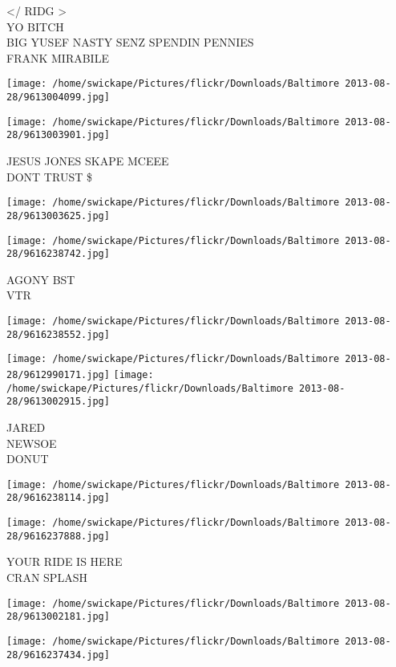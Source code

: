 \documentclass[10pt,letterpaper]{article}
\begin{document}
</  RIDG >\\
YO BITCH\\
BIG YUSEF NASTY SENZ SPENDIN PENNIES\\
FRANK MIRABILE
\pagebreak

\texttt{[image: /home/swickape/Pictures/flickr/Downloads/Baltimore 2013-08-28/9613004099.jpg]}

\vspace{0.25in}
\texttt{[image: /home/swickape/Pictures/flickr/Downloads/Baltimore 2013-08-28/9613003901.jpg]}

JESUS JONES SKAPE MCEEE\\
DONT TRUST \$
\pagebreak

\texttt{[image: /home/swickape/Pictures/flickr/Downloads/Baltimore 2013-08-28/9613003625.jpg]}

\vspace{0.25in}
\texttt{[image: /home/swickape/Pictures/flickr/Downloads/Baltimore 2013-08-28/9616238742.jpg]}

AGONY BST\\
VTR
\pagebreak

\texttt{[image: /home/swickape/Pictures/flickr/Downloads/Baltimore 2013-08-28/9616238552.jpg]}

\vspace{0.25in}
\texttt{[image: /home/swickape/Pictures/flickr/Downloads/Baltimore 2013-08-28/9612990171.jpg]}
\texttt{[image: /home/swickape/Pictures/flickr/Downloads/Baltimore 2013-08-28/9613002915.jpg]}

JARED\\
NEWSOE\\
DONUT
\pagebreak

\texttt{[image: /home/swickape/Pictures/flickr/Downloads/Baltimore 2013-08-28/9616238114.jpg]}

\vspace{0.25in}
\texttt{[image: /home/swickape/Pictures/flickr/Downloads/Baltimore 2013-08-28/9616237888.jpg]}

YOUR RIDE IS HERE\\
CRAN SPLASH
\pagebreak

\texttt{[image: /home/swickape/Pictures/flickr/Downloads/Baltimore 2013-08-28/9613002181.jpg]}

\vspace{0.25in}
\texttt{[image: /home/swickape/Pictures/flickr/Downloads/Baltimore 2013-08-28/9616237434.jpg]}
\end{document}
